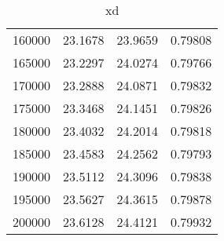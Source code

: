 \begin{table}
\begin{tabular}{|l|l|l|l|}
160000 & 23.1678 & 23.9659 & 0.79808 \\ 
165000 & 23.2297 & 24.0274 & 0.79766 \\ 
170000 & 23.2888 & 24.0871 & 0.79832 \\ 
175000 & 23.3468 & 24.1451 & 0.79826 \\ 
180000 & 23.4032 & 24.2014 & 0.79818 \\ 
185000 & 23.4583 & 24.2562 & 0.79793 \\ 
190000 & 23.5112 & 24.3096 & 0.79838 \\ 
195000 & 23.5627 & 24.3615 & 0.79878 \\ 
200000 & 23.6128 & 24.4121 & 0.79932 \\ 
\hline 
\end{tabular}
\caption{xd}
\end{table}
